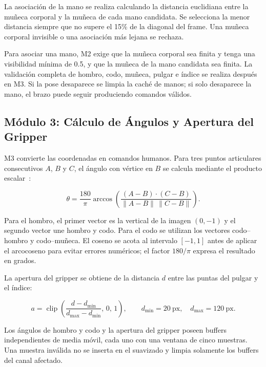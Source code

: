 La asociación de la mano se realiza calculando la distancia euclidiana entre
la muñeca corporal y la muñeca de cada mano candidata. Se selecciona la menor
distancia siempre que no supere el 15\% de la diagonal del frame. Una muñeca
corporal invisible o una asociación más lejana se rechaza.

Para asociar una mano, M2 exige que la muñeca corporal sea finita y tenga una
visibilidad mínima de 0.5, y que la muñeca de la mano candidata sea finita. La
validación completa de hombro, codo, muñeca, pulgar e índice se realiza después
en M3. Si la pose desaparece se limpia la caché de manos; si solo desaparece la
mano, el brazo puede seguir produciendo comandos válidos.

\subsection{Módulo 3: Cálculo de Ángulos y Apertura del Gripper}
\label{subsec:implementacion_m3}

M3 convierte las coordenadas en comandos humanos. Para tres puntos
articulares consecutivos $A$, $B$ y $C$, el ángulo con vértice en $B$ se
calcula mediante el producto escalar~\cite{GonzalezWoods2018}:

\begin{equation}
    \theta = \frac{180}{\pi}\arccos\!\left(
        \frac{(A-B) \cdot (C-B)}
        {\lVert A-B \rVert\,\lVert C-B \rVert}
    \right).
    \label{eq:angulo_articular}
\end{equation}

Para el hombro, el primer vector es la vertical de la imagen $(0,-1)$ y el
segundo vector une hombro y codo. Para el codo se utilizan los vectores
codo--hombro y codo--muñeca. El coseno se acota al intervalo $[-1,1]$ antes de
aplicar el arcocoseno para evitar errores numéricos; el factor $180/\pi$
expresa el resultado en grados.

La apertura del gripper se obtiene de la distancia $d$ entre las puntas del
pulgar y el índice:

\begin{equation}
    a = \operatorname{clip}\!\left(
        \frac{d-d_{\mathrm{min}}}{d_{\mathrm{max}}-d_{\mathrm{min}}},\,0,\,1
    \right),
    \qquad d_{\mathrm{min}}=20\ \text{px},\quad
    d_{\mathrm{max}}=120\ \text{px}.
    \label{eq:apertura_gripper}
\end{equation}

Los ángulos de hombro y codo y la apertura del gripper poseen buffers
independientes de media móvil, cada uno con una ventana de cinco muestras. Una
muestra inválida no se inserta en el suavizado y limpia solamente los buffers
del canal afectado.

